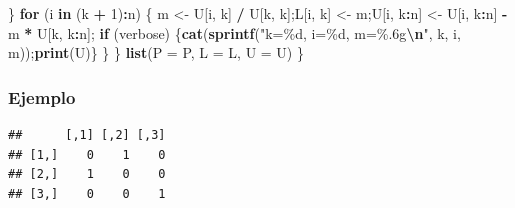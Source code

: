 \documentclass[
]{book}
\newenvironment{Shaded}{\begin{snugshade}}{\end{snugshade}}
\newcommand{\AttributeTok}[1]{\textcolor[rgb]{0.13,0.29,0.53}{#1}}
\newcommand{\ConstantTok}[1]{\textcolor[rgb]{0.56,0.35,0.01}{#1}}
\newcommand{\ControlFlowTok}[1]{\textcolor[rgb]{0.13,0.29,0.53}{\textbf{#1}}}
\newcommand{\DecValTok}[1]{\textcolor[rgb]{0.00,0.00,0.81}{#1}}
\newcommand{\FunctionTok}[1]{\textcolor[rgb]{0.13,0.29,0.53}{\textbf{#1}}}
\newcommand{\NormalTok}[1]{#1}
\newcommand{\OtherTok}[1]{\textcolor[rgb]{0.56,0.35,0.01}{#1}}
\newcommand{\SpecialCharTok}[1]{\textcolor[rgb]{0.81,0.36,0.00}{\textbf{#1}}}
\newcommand{\StringTok}[1]{\textcolor[rgb]{0.31,0.60,0.02}{#1}}
\begin{document}
\begin{Shaded}
\begin{Highlighting}[]
\NormalTok{    \}}
    \ControlFlowTok{for}\NormalTok{ (i }\ControlFlowTok{in}\NormalTok{ (k }\SpecialCharTok{+} \DecValTok{1}\NormalTok{)}\SpecialCharTok{:}\NormalTok{n) \{}
\NormalTok{      m }\OtherTok{\textless{}{-}}\NormalTok{ U[i, k] }\SpecialCharTok{/}\NormalTok{ U[k, k];L[i, k] }\OtherTok{\textless{}{-}}\NormalTok{ m;U[i, k}\SpecialCharTok{:}\NormalTok{n] }\OtherTok{\textless{}{-}}\NormalTok{ U[i, k}\SpecialCharTok{:}\NormalTok{n] }\SpecialCharTok{{-}}\NormalTok{ m }\SpecialCharTok{*}\NormalTok{ U[k, k}\SpecialCharTok{:}\NormalTok{n];}
      \ControlFlowTok{if}\NormalTok{ (verbose) \{}\FunctionTok{cat}\NormalTok{(}\FunctionTok{sprintf}\NormalTok{(}\StringTok{"k=\%d, i=\%d, m=\%.6g}\SpecialCharTok{\textbackslash{}n}\StringTok{"}\NormalTok{, k, i, m));}\FunctionTok{print}\NormalTok{(U)\}}
\NormalTok{    \}}
\NormalTok{  \}}
  \FunctionTok{list}\NormalTok{(}\AttributeTok{P =}\NormalTok{ P, }\AttributeTok{L =}\NormalTok{ L, }\AttributeTok{U =}\NormalTok{ U)}
\NormalTok{\}}
\end{Highlighting}
\end{Shaded}

\subsubsection{Ejemplo}\label{ejemplo-5}

\begin{Shaded}
\end{Shaded}

\begin{verbatim}
##      [,1] [,2] [,3]
## [1,]    0    1    0
## [2,]    1    0    0
## [3,]    0    0    1
\end{verbatim}
\end{document}
